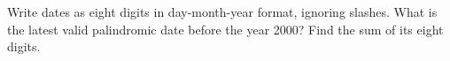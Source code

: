 Write dates as eight digits in day-month-year format, ignoring slashes. What is the latest valid palindromic date before the year 2000? Find the sum of its eight digits.
